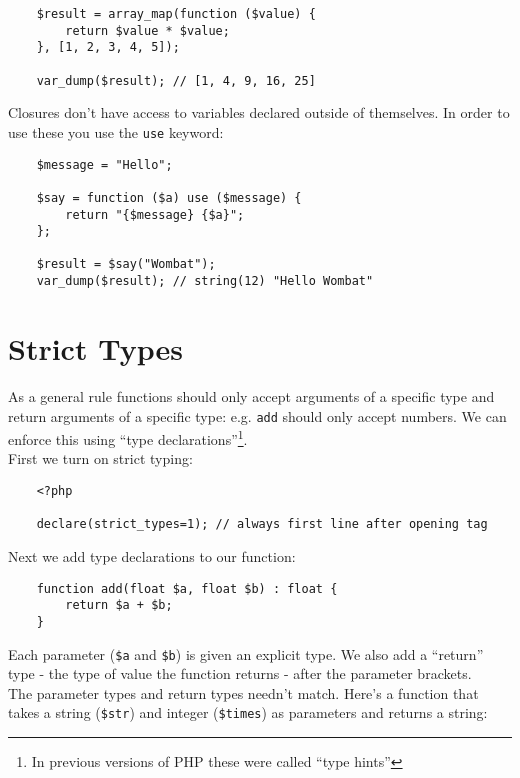 \begin{verbatim}
    $result = array_map(function ($value) {
        return $value * $value;
    }, [1, 2, 3, 4, 5]);

    var_dump($result); // [1, 4, 9, 16, 25]
\end{verbatim}

Closures don't have access to variables declared outside of themselves. In order to use these you use the \texttt{use} keyword:

\begin{verbatim}
    $message = "Hello";

    $say = function ($a) use ($message) {
        return "{$message} {$a}";
    };

    $result = $say("Wombat");
    var_dump($result); // string(12) "Hello Wombat"
\end{verbatim}


\section{Strict Types}

As a general rule functions should only accept arguments of a specific type and return arguments of a specific type: e.g. \texttt{add} should only accept numbers. We can enforce this using ``type declarations''\footnote{In previous versions of PHP these were called ``type hints''}.
\\

First we turn on strict typing:

\begin{verbatim}
    <?php

    declare(strict_types=1); // always first line after opening tag
\end{verbatim}

Next we add type declarations to our function:

\begin{verbatim}
    function add(float $a, float $b) : float {
        return $a + $b;
    }
\end{verbatim}

Each parameter (\texttt{\$a} and \texttt{\$b}) is given an explicit type. We also add a ``return'' type - the type of value the function returns - after the parameter brackets.
\\

The parameter types and return types needn't match. Here's a function that takes a string (\texttt{\$str}) and integer (\texttt{\$times}) as parameters and returns a string:

